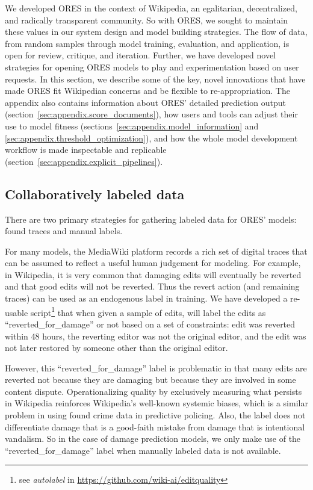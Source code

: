 We developed ORES in the context of Wikipedia, an egalitarian, decentralized, and radically transparent community.  So with ORES, we sought to maintain these values in our system design and model building strategies.  The flow of data, from random samples through model training, evaluation, and application, is open for review, critique, and iteration.  Further, we have developed novel strategies for opening ORES models to play and experimentation based on user requests.  In this section, we describe some of the key, novel innovations that have made ORES fit Wikipedian concerns and be flexible to re-appropriation.  The appendix also contains information about ORES' detailed prediction output (section~\ref{sec:appendix.score_documents}), how users and tools can adjust their use to model fitness (sections~\ref{sec:appendix.model_information} and \ref{sec:appendix.threshold_optimization}), and how the whole model development workflow is made inspectable and replicable (section~\ref{sec:appendix.explicit_pipelines}).

\subsection{Collaboratively labeled data}
There are two primary strategies for gathering labeled data for ORES' models: found traces and manual labels.

 For many models, the MediaWiki platform records a rich set of digital traces that can be assumed to reflect a useful human judgement for modeling.  For example, in Wikipedia, it is very common that damaging edits will eventually be reverted and that good edits will not be reverted.  Thus the revert action (and remaining traces) can be used as an endogenous label in training.  We have developed a re-usable script\footnote{see \emph{autolabel} in \url{https://github.com/wiki-ai/editquality}} that when given a sample of edits, will label the edits as ``reverted\_for\_damage'' or not based on a set of constraints: edit was reverted within 48 hours, the reverting editor was not the original editor, and the edit was not later restored by someone other than the original editor.

However, this ``reverted\_for\_damage'' label is problematic in that many edits are reverted not because they are damaging but because they are involved in some content dispute.  Operationalizing quality by exclusively measuring what persists in Wikipedia reinforces Wikipedia's well-known systemic biases, which is a similar problem in using found crime data in predictive policing.  Also, the label does not differentiate damage that is a good-faith mistake from damage that is intentional vandalism.  So in the case of damage prediction models, we only make use of the ``reverted\_for\_damage'' label when manually labeled data is not available.

